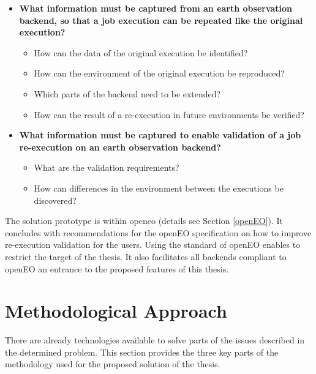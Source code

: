\documentclass[draft,final]{vutinfth} %
\begin{document}
\begin{itemize}
	\item \textbf{What information must be captured from an earth observation backend, so that a job execution can be repeated like the original execution?}
	\begin{itemize}
		\item How can the data of the original execution be identified?
		\item How can the environment of the original execution be reproduced?
		\item Which parts of the backend need to be extended?
		\item How can the result of a re-execution in future environments be verified?
	\end{itemize}
	\item \textbf{What information must be captured to enable validation of a job re-execution on an earth observation backend?}
	\begin{itemize}
		\item What are the validation requirements?
		\item How can differences in the environment between the executions be discovered?
	\end{itemize}
\end{itemize}

The solution prototype is within \gls{openeo} (details see Section \ref{openEO}). It concludes with recommendations for the openEO specification on how to improve re-execution validation for the users. Using the standard of openEO enables to restrict the target of the thesis. It also facilitates all backends compliant to openEO an entrance to the proposed features of this thesis. 

\section{Methodological Approach}\label{Method}
There are already technologies available to solve parts of the issues described in the determined problem. This section provides the three key parts of the methodology used for the proposed solution of the thesis.
\end{document}
